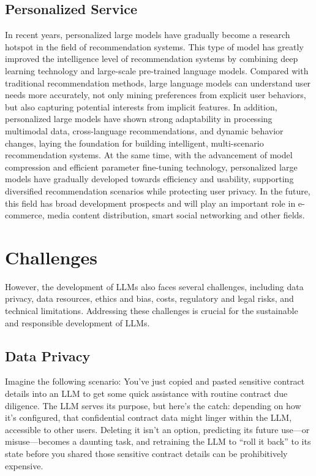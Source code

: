 \documentclass[fleqn,10pt]{SelfArx} %
\begin{document}
\subsection{Personalized Service}
In recent years, personalized large models have gradually become a research hotspot in the field of recommendation systems. This type of model has greatly improved the intelligence level of recommendation systems by combining deep learning technology and large-scale pre-trained language models. Compared with traditional recommendation methods, large language models can understand user needs more accurately, not only mining preferences from explicit user behaviors, but also capturing potential interests from implicit features. In addition, personalized large models have shown strong adaptability in processing multimodal data, cross-language recommendations, and dynamic behavior changes, laying the foundation for building intelligent, multi-scenario recommendation systems. At the same time, with the advancement of model compression and efficient parameter fine-tuning technology, personalized large models have gradually developed towards efficiency and usability, supporting diversified recommendation scenarios while protecting user privacy. In the future, this field has broad development prospects and will play an important role in e-commerce, media content distribution, smart social networking and other fields.\cite{csdn-person-rec}
\section{Challenges}
However, the development of LLMs also faces several challenges, including data privacy, data resources, ethics and bias, costs, regulatory and legal risks, and technical limitations. Addressing these challenges is crucial for the sustainable and responsible development of LLMs.
\subsection{Data Privacy}
Imagine the following scenario: You've just copied and pasted sensitive contract details into an LLM to get some quick assistance with routine contract due diligence. The LLM serves its purpose, but here's the catch: depending on how it's configured, that confidential contract data might linger within the LLM, accessible to other users. Deleting it isn't an option, predicting its future use—or misuse—becomes a daunting task, and retraining the LLM to “roll it back” to its state before you shared those sensitive contract details can be prohibitively expensive.\cite{stackoverflow-dataprivacy}
\end{document}
